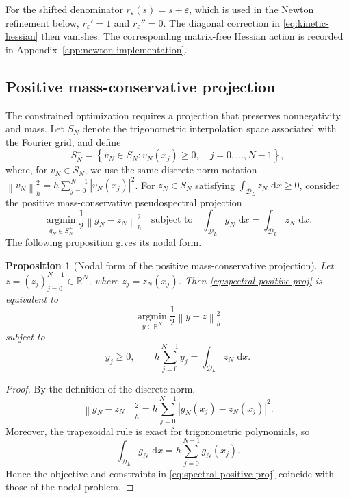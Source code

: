 \documentclass[11pt]{article}
\newcommand{\R}{\mathbb{R}}
\newcommand{\SN}{S_N}
\newcommand{\SNP}{S_N^+}
\newcommand{\dd}{\,\mathrm{d}}
\newcommand{\eps}{\varepsilon}
\newcommand{\norm}[1]{\left\|#1\right\|}
\theoremstyle{plain}
\newtheorem{proposition}[theorem]{Proposition}
\theoremstyle{definition}
\numberwithin{equation}{section}
\begin{document}
For the shifted denominator $r_\eps(s)=s+\eps$, which is used in the
Newton refinement below, $r_\eps'=1$ and $r_\eps''=0$. The diagonal
correction in \eqref{eq:kinetic-hessian} then vanishes. The
corresponding matrix-free Hessian action is recorded in
Appendix~\ref{app:newton-implementation}.

\subsection{Positive mass-conservative projection}

The constrained optimization requires a projection that preserves
nonnegativity and mass. Let $\SN$ denote the trigonometric
interpolation space associated with the Fourier grid, and define
\begin{equation}
\label{eq:SNplus}
\SNP
=
\left\{
v_N\in\SN:
v_N(x_j)\ge0,\quad j=0,\ldots,N-1
\right\},
\end{equation}
where, for $v_N\in\SN$, we use the same discrete norm notation
$\norm{v_N}_h^2
=
h\sum_{j=0}^{N-1}|v_N(x_j)|^2$.
For $z_N\in\SN$ satisfying $\int_{\mathcal D_L}z_N\,\dd x \ge 0$, consider the positive mass-conservative
pseudospectral projection \cite{lin2024sinum}
\begin{equation}
\label{eq:spectral-positive-proj}
\operatorname*{argmin}_{g_N\in\SNP}
\frac12\norm{g_N-z_N}_h^2
\quad
\text{subject to}
\quad
\int_{\mathcal D_L}g_N\,\dd x
=
\int_{\mathcal D_L}z_N\,\dd x .
\end{equation}
The following proposition gives its nodal form.

\begin{proposition}[Nodal form of the positive mass-conservative projection]
\label{prop:proj-equiv}
Let $z=(z_j)_{j=0}^{N-1}\in\R^N$, where $z_j=z_N(x_j)$.
Then \eqref{eq:spectral-positive-proj} is equivalent to
\[
\operatorname*{argmin}_{y\in\R^N}
\frac12\norm{y-z}_h^2
\]
subject to
\[
y_j\ge0,
\qquad
h\sum_{j=0}^{N-1}y_j
=
\int_{\mathcal D_L}z_N\,\dd x .
\]
\end{proposition}

\begin{proof}
By the definition of the discrete norm,
\[
\norm{g_N-z_N}_h^2
=
h\sum_{j=0}^{N-1}
|g_N(x_j)-z_N(x_j)|^2.
\]
Moreover, the trapezoidal rule is exact for trigonometric
polynomials, so
\[
\int_{\mathcal D_L}g_N\,\dd x
=
h\sum_{j=0}^{N-1}g_N(x_j).
\]
Hence the objective and constraints in
\eqref{eq:spectral-positive-proj} coincide with those of the nodal
problem.
\end{proof}
\end{document}
